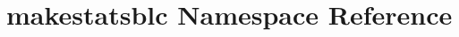 \hypertarget{namespacemakestatsblc}{\section{makestatsblc Namespace Reference}
\label{namespacemakestatsblc}
}
